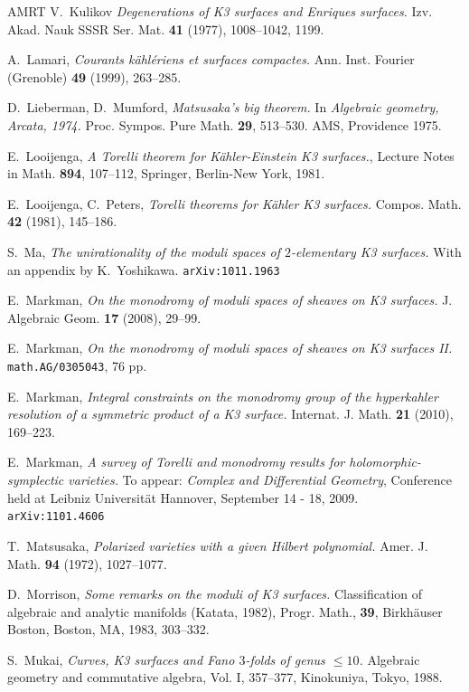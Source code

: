 \documentclass[a4paper,11pt]{article}
\begin{document}
\begin{thebibliography}{AMRT}
 V.~Kulikov {\it Degenerations of K3 surfaces and
  Enriques surfaces.} Izv. Akad. Nauk SSSR Ser. Mat.  {\bf 41} (1977),
  1008--1042, 1199.

 A.~Lamari, {\it Courants k\"ahl\'eriens et surfaces
  compactes.}  Ann. Inst. Fourier (Grenoble) {\bf 49} (1999),
  263--285.

 D.~Lieberman, D.~Mumford, {\it Matsusaka's big
  theorem.} In {\it Algebraic geometry, Arcata,
  1974.} Proc. Sympos. Pure Math. {\bf 29}, 513--530. AMS, Providence
  1975.

 E.~Looijenga, {\it A Torelli theorem for
  K\"ahler-Einstein K3 surfaces.}, Lecture Notes in Math. {\bf 894},
  107--112, Springer, Berlin-New York, 1981.

 E.~Looijenga, C.~Peters, {\it Torelli theorems for
  K\"ahler K3 surfaces.}  Compos. Math. {\bf 42} (1981), 145--186.

 S.~Ma, {\it The unirationality of the moduli spaces
  of $2$-elementary K3 surfaces.}  With an appendix by
  K.~Yoshikawa. {\tt arXiv:1011.1963}

 E.~Markman, {\it On the monodromy of moduli
  spaces of sheaves on K3 surfaces.} J. Algebraic Geom.  {\bf 17}
  (2008), 29--99.

 E.~Markman, {\it On the monodromy of moduli
  spaces of sheaves on K3 surfaces II.} {\tt math.AG/0305043}, 76 pp.

 E.~Markman, {\it Integral constraints on the
  monodromy group of the hyperkahler resolution of a symmetric product
  of a K3 surface.} Internat. J. Math.  {\bf 21}  (2010), 169--223.

 E.~Markman, {\it A survey of Torelli and
  monodromy results for holomorphic-symplectic varieties.}  To appear:
  {\it Complex and Differential Geometry}, Conference held at Leibniz
  Universit\"at Hannover, September 14 - 18, 2009. {\tt
    arXiv:1101.4606}

 T.~Matsusaka, {\it Polarized varieties with a
  given Hilbert polynomial.}  Amer. J. Math. {\bf 94} (1972),
  1027--1077.

 D.~Morrison, {\it Some remarks on the moduli of K3
  surfaces.}  Classification of algebraic and analytic manifolds
  (Katata, 1982), Progr. Math., {\bf 39}, Birkh\"auser Boston, Boston,
  MA, 1983, 303--332.

 S.~Mukai, {\it Curves, K3 surfaces and Fano
  $3$-folds of genus $\leq 10$.}  Algebraic geometry and commutative
  algebra, Vol. I, 357--377, Kinokuniya, Tokyo, 1988.


\end{thebibliography}
\end{document}
